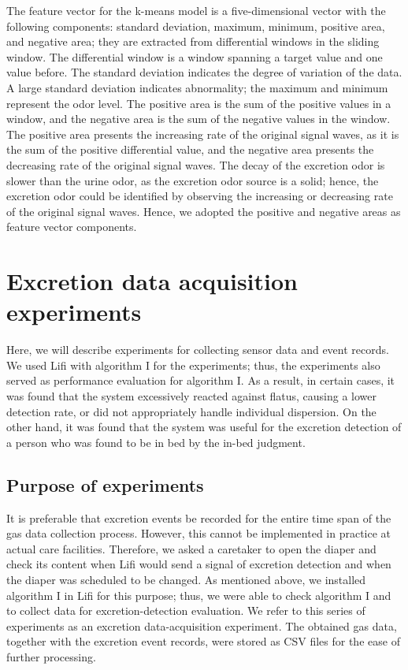 \documentclass[publish,JRM,paper]{jaciiiarticle}
\begin{document}
The feature vector for the k-means model is a five-dimensional vector with the following components: {standard deviation, maximum, minimum, positive area, and negative area}; they are extracted from differential windows in the sliding window. The differential window is a window spanning a target value and one value before. The standard deviation indicates the degree of variation of the data. A large standard deviation indicates abnormality; the maximum and minimum represent the odor level. The positive area is the sum of the positive values in a window, and the negative area is the sum of the negative values in the window. The positive area presents the increasing rate of the original signal waves, as it is the sum of the positive differential value, and the negative area presents the decreasing rate of the original signal waves. The decay of the excretion odor is slower than the urine odor, as the excretion odor source is a solid; hence, the excretion odor could be identified by observing the increasing or decreasing rate of the original signal waves. Hence, we adopted the positive and negative areas as feature vector components.

\section{Excretion data acquisition experiments}
Here, we will describe experiments for collecting sensor data and event records. We used Lifi with algorithm I for the experiments; thus, the experiments also served as performance evaluation for algorithm I. As a result, in certain cases, it was found that the system excessively reacted against flatus, causing a lower detection rate, or did not appropriately handle individual dispersion. On the other hand, it was found that the system was useful for the excretion detection of a person who was found to be in bed by the in-bed judgment.

\subsection{Purpose of experiments}
It is preferable that excretion events be recorded for the entire time span of the gas data collection process. However, this cannot be implemented in practice at actual care facilities. Therefore, we asked a caretaker to open the diaper and check its content when Lifi would send a signal of excretion detection and when the diaper was scheduled to be changed. As mentioned above, we installed algorithm I in Lifi for this purpose; thus, we were able to check algorithm I and to collect data for excretion-detection evaluation. We refer to this series of experiments as an excretion data-acquisition experiment.  The obtained gas data, together with the excretion event records, were stored as CSV files for the ease of further processing.
\end{document}
